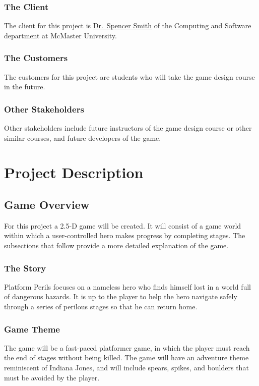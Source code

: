\documentclass[12pt, titlepage]{article}
\begin{document}
\subsubsection{The Client}
The client for this project is \href{http://www.cas.mcmaster.ca/~smiths/}{Dr.~Spencer Smith} of the Computing and Software department at McMaster University.
\subsubsection{The Customers}
The customers for this project are students who will take the game design course in the future.
\subsubsection{Other Stakeholders}
Other stakeholders include future instructors of the game design course or other similar courses, and future developers of the game.

\newpage
\section{Project Description}
\subsection{Game Overview}
For this project a 2.5-D game will be created.  It will consist of a game world within which a user-controlled hero makes progress by completing stages.  The subsections that follow provide a more detailed explanation of the game.

\subsubsection{The Story}
Platform Perils focuses on a nameless hero who finds himself lost in a world full of dangerous hazards.  It is up to the player to help the hero navigate safely through a series of perilous stages so that he can return home.

\subsubsection{Game Theme}
The game will be a fast-paced platformer game, in which the player must reach the end of stages without being killed.  The game will have an adventure theme reminiscent of Indiana Jones, and will include spears, spikes, and boulders that must be avoided by the player.
\end{document}
